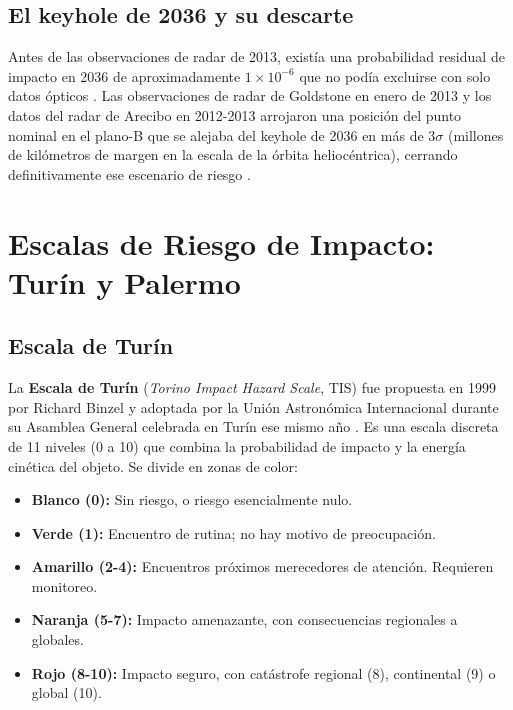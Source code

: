 \documentclass[a4paper]{article}
\begin{document}
\subsection{El keyhole de 2036 y su descarte}

Antes de las observaciones de radar de 2013, existía una probabilidad residual de impacto en 2036 de aproximadamente $1\times 10^{-6}$ que no podía excluirse con solo datos ópticos \cite{farnocchia2013yarkovsky}. Las observaciones de radar de Goldstone en enero de 2013 y los datos del radar de Arecibo en 2012-2013 arrojaron una posición del punto nominal en el plano-B que se alejaba del keyhole de 2036 en más de $3\sigma$ (millones de kilómetros de margen en la escala de la órbita heliocéntrica), cerrando definitivamente ese escenario de riesgo \cite{brozovic2018radar, farnocchia2013yarkovsky}.

\section{Escalas de Riesgo de Impacto: Turín y Palermo}

\subsection{Escala de Turín}

La \textbf{Escala de Turín} (\textit{Torino Impact Hazard Scale}, TIS) fue propuesta en 1999 por Richard Binzel y adoptada por la Unión Astronómica Internacional durante su Asamblea General celebrada en Turín ese mismo año \cite{binzel1999torino}. Es una escala discreta de 11 niveles (0 a 10) que combina la probabilidad de impacto y la energía cinética del objeto. Se divide en zonas de color:

\begin{itemize}
  \item \textbf{Blanco (0):} Sin riesgo, o riesgo esencialmente nulo.
  \item \textbf{Verde (1):} Encuentro de rutina; no hay motivo de preocupación.
  \item \textbf{Amarillo (2-4):} Encuentros próximos merecedores de atención. Requieren monitoreo.
  \item \textbf{Naranja (5-7):} Impacto amenazante, con consecuencias regionales a globales.
  \item \textbf{Rojo (8-10):} Impacto seguro, con catástrofe regional (8), continental (9) o global (10).
\end{itemize}
\end{document}
